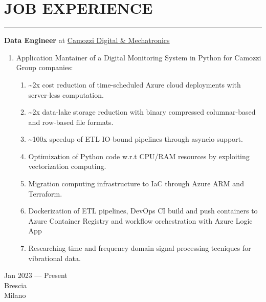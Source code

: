 \documentclass[10pt]{article}
\newcommand{\cvsection}[1]{\section*{\centering\normalsize\uppercase{#1}}\vspace{-16pt}\rule{\linewidth}{0.2pt}\vspace{6pt}}
\begin{document}
\cvsection{Job Experience}
\noindent
\begin{minipage}[t]{.80\textwidth}
	\raggedright
	\textbf{Data Engineer} at \href{https://en.digitalmechatronics.camozzi.com/}{Camozzi Digital \& Mechatronics}
	\begin{enumerate}
		\item Application Mantainer of a Digital Monitoring System in Python for Camozzi Group companies:
		\begin{enumerate}
			\item \textasciitilde 2x cost reduction of time-scheduled Azure cloud deployments with server-less computation.
   		\item \textasciitilde 2x data-lake storage reduction with binary compressed columnar-based and row-based file formats.
			\item \textasciitilde 100x speedup of ETL IO-bound pipelines through asyncio support.
    	  \item Optimization of Python code w.r.t CPU/RAM resources by exploiting vectorization computing.
            \item Migration computing infrastructure to IaC through Azure ARM and Terraform.
			\item Dockerization of ETL pipelines, DevOps CI build and push containers to Azure Container Registry and workflow orchestration with Azure Logic App
			\item Researching time and frequency domain signal processing tecniques for vibrational data.
		\end{enumerate}
  \end{enumerate}
\end{minipage}%
\hspace{.02\textwidth}\vrule\hspace{.02\textwidth}
\begin{minipage}[t]{.16\textwidth}
	\raggedleft
	Jan 2023 --- Present\\
	\small Brescia\\
	\small Milano\\
\end{minipage}%
\noindent
\end{document}
